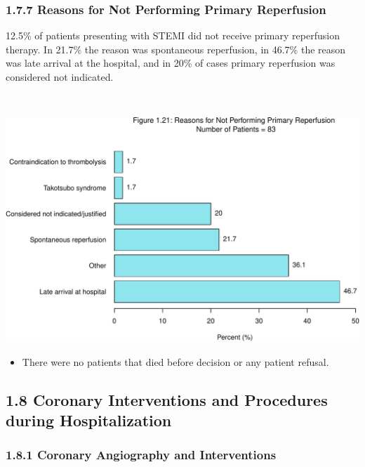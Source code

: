 \documentclass[
]{article}
\providecommand{\tightlist}{%
  \setlength{\itemsep}{0pt}\setlength{\parskip}{0pt}}
\begin{document}
\pagebreak

\subsubsection{1.7.7 Reasons for Not Performing Primary
Reperfusion}\label{reasons-for-not-performing-primary-reperfusion}

12.5\% of patients presenting with STEMI did not receive primary
reperfusion therapy. In 21.7\% the reason was spontaneous reperfusion,
in 46.7\% the reason was late arrival at the hospital, and in 20\% of
cases primary reperfusion was considered not indicated.

~

\includegraphics{ACSIS_2024_v1_pdf_files/figure-latex/unnamed-chunk-72-1.pdf}

\begin{itemize}
\tightlist
\item
  There were no patients that died before decision or any patient
  refusal.
\end{itemize}

\pagebreak

\subsection{1.8 Coronary Interventions and Procedures during
Hospitalization}\label{coronary-interventions-and-procedures-during-hospitalization}

\subsubsection{1.8.1 Coronary Angiography and
Interventions}\label{coronary-angiography-and-interventions}
\end{document}
